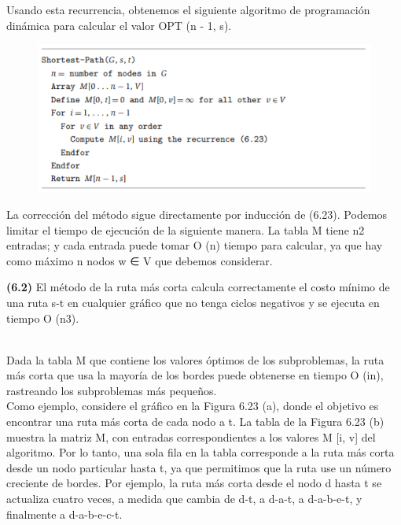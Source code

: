 \documentclass[a4paper]{article}
\begin{document}
Usando esta recurrencia, obtenemos el siguiente algoritmo de programación dinámica para calcular el valor OPT (n - 1, s).\\

\begin{figure}[h]
\centering
\includegraphics[scale=1.2]{Imagenes-Seccion6/cod6_17.PNG}
\end{figure}

La corrección del método sigue directamente por inducción de (6.23). Podemos limitar el tiempo de ejecución de la siguiente manera. La tabla M tiene n2 entradas; y cada entrada puede tomar O (n) tiempo para calcular, ya que hay como máximo n nodos w ∈ V que debemos considerar.\\

\colorbox{mygray}{\parbox{15cm}{
\textbf{(6.2)} El método de la ruta más corta calcula correctamente el costo mínimo de una ruta s-t en cualquier gráfico que no tenga ciclos negativos y se ejecuta en tiempo O (n3).}}\\

Dada la tabla M que contiene los valores óptimos de los subproblemas, la ruta más corta que usa la mayoría de los bordes puede obtenerse en tiempo O (in), rastreando los subproblemas más pequeños.\\

Como ejemplo, considere el gráfico en la Figura 6.23 (a), donde el objetivo es encontrar una ruta más corta de cada nodo a t. La tabla de la Figura 6.23 (b) muestra la matriz M, con entradas correspondientes a los valores M [i, v] del algoritmo. Por lo tanto, una sola fila en la tabla corresponde a la ruta más corta desde un nodo particular hasta t, ya que permitimos que la ruta use un número creciente de bordes. Por ejemplo, la ruta más corta desde el nodo d hasta t se actualiza cuatro veces, a medida que cambia de d-t, a d-a-t, a d-a-b-e-t, y finalmente a d-a-b-e-c-t.\\
\end{document}
